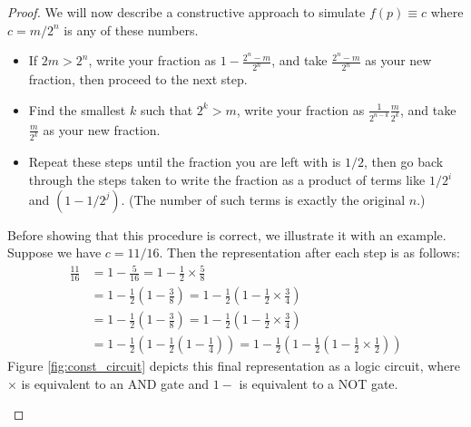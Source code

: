 \documentclass{article}
\theoremstyle{definition}
\begin{document}
\begin{proof}
We will now describe a constructive approach to simulate $f(p)\equiv c$ where $c = m/2^n$ is any of these numbers.
\begin{itemize}
\item If $2m > 2^n$, write your fraction as $1 - \frac{2^n - m}{2^n}$, and take $\frac{2^n - m}{2^n}$ as your new fraction, then proceed to the next step.
\item Find the smallest $k$ such that $2^k > m$, write your fraction as $\frac{1}{2^{n-k}}\frac{m}{2^k}$, and take $\frac{m}{2^k}$ as your new fraction.
\item Repeat these steps until the fraction you are left with is $1/2$, then go back through the steps taken to write the fraction as a product of terms like $1/2^i$ and $(1-1/2^j)$. (The number of such terms is exactly the original $n$.)
\end{itemize}
Before showing that this procedure is correct, we illustrate it with an example.
Suppose we have $c = 11/16$.
Then the representation after each step is as follows:
\begin{align*}
\frac{11}{16} &= 1- \frac{5}{16} 
= 1 - \frac{1}{2} \times \frac{5}{8} \\
&= 1 - \frac{1}{2} \left(1 - \frac{3}{8}\right) 
= 1 - \frac{1}{2} \left(1 - \frac{1}{2} \times \frac{3}{4}\right) \\
&= 1 - \frac{1}{2} \left(1 - \frac{3}{8}\right) 
= 1 - \frac{1}{2} \left(1 - \frac{1}{2} \times \frac{3}{4}\right) \\
&= 1 - \frac{1}{2} \left(1 - \frac{1}{2}\left(1-\frac{1}{4}\right)\right)
= 1 - \frac{1}{2} \left(1 - \frac{1}{2}\left(1-\frac{1}{2} \times \frac{1}{2}\right)\right)
\end{align*}
Figure \ref{fig:const_circuit} depicts this final representation as a logic circuit, where $\times$ is equivalent to an {\footnotesize AND} gate and $1-$ is equivalent to a {\footnotesize NOT} gate.

\begin{figure}
\centering
{}
\end{figure}
\end{proof}
\end{document}
